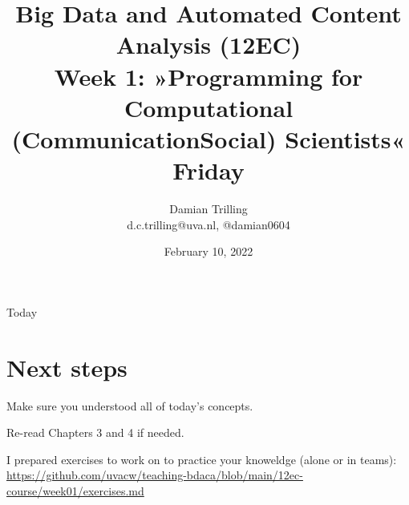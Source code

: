 

\graphicspath{{../../resources/img/}}




\title[Big Data and Automated Content Analysis]{\textbf{Big Data and Automated Content Analysis (12EC)} 
\\Week 1: »Programming for Computational (Communication\textbar Social) Scientists«
\\Friday }
\author[Damian Trilling]{Damian Trilling\\ \footnotesize{d.c.trilling@uva.nl, @damian0604 \\}}
\date{February 10, 2022}


\begin{frame}{}
	\titlepage
\end{frame}

\begin{frame}{Today}
	\tableofcontents
\end{frame}










\section{Next steps}




\begin{frame}[standout]
Make sure you understood all of today's concepts.

Re-read Chapters 3 and 4 if needed.

I prepared exercises to work on to practice your knoweldge (alone or in teams):
\large{\url{https://github.com/uvacw/teaching-bdaca/blob/main/12ec-course/week01/exercises.md}}
\end{frame}





\begin{frame}
	\printbibliography
\end{frame}




